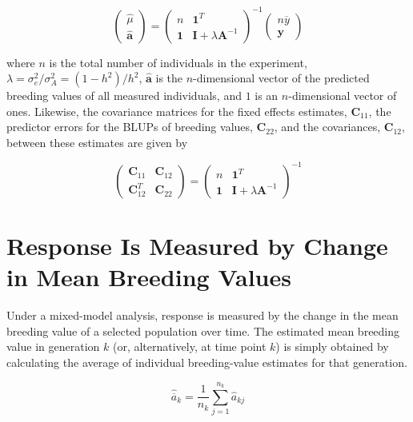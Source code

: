 \documentclass{article}
\begin{document}
\begin{equation}
\begin{pmatrix}\widehat{\mu}\\\widehat{\mathbf{a}}\end{pmatrix}=\begin{pmatrix}n&\mathbf{1}^{T}\\\mathbf{1}&\mathbf{I}+\lambda\mathbf{A}^{-1}\end{pmatrix}^{-1}\begin{pmatrix}n\overline{y}\\\mathbf{y}\end{pmatrix}
\tag{19.7c}
\label{eq:19_7c}
\end{equation}

where $n$ is the total number of individuals in the experiment, $\lambda = \sigma_e^2 / \sigma_A^2 = (1 - h^2) / h^2$, $\hat{\mathbf{a}}$ is the $n$-dimensional vector of the predicted breeding values of all measured individuals, and $1$ is an $n$-dimensional vector of ones. Likewise, the covariance matrices for the fixed effects estimates, $\mathbf{C}_{11}$, the predictor errors for the BLUPs of breeding values, $\mathbf{C}_{22}$, and the covariances, $\mathbf{C}_{12}$, between these estimates are given by

\begin{equation}
\begin{pmatrix}\mathbf{C}_{11}&\mathbf{C}_{12}\\\mathbf{C}_{12}^{T}&\mathbf{C}_{22}\end{pmatrix}=\begin{pmatrix}n&\mathbf{1}^{T}\\\mathbf{1}&\mathbf{I}+\lambda\mathbf{A}^{-1}\end{pmatrix}^{-1}
\tag{19.7d}
\label{eq:19_7d}
\end{equation}

\section{Response Is Measured by Change in Mean Breeding Values}
Under a mixed-model analysis, response is measured by the change in the mean breeding value of a selected population over time. The estimated mean breeding value in generation  $ k $ (or, alternatively, at time point  $ k $) is simply obtained by calculating the average of individual breeding-value estimates for that generation.

\begin{equation}
\widehat{\overline{a}}_{k}=\frac{1}{n_{k}}\sum_{j=1}^{n_{k}}\widehat{a}_{kj}
\tag{19.8a}
\label{eq:19_8a}
\end{equation}
\end{document}
